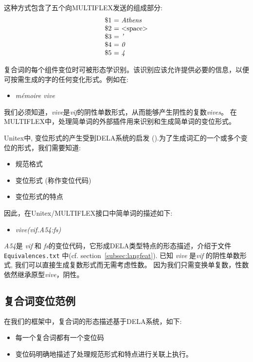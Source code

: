 \bigskip
\noindent 这种方式包含了五个向MULTIFLEX发送的组成部分:
\[
\begin{array}[c]{l}
$\$1 = \emph{Athens}$ \\
$\$2 = $<$space$>$$ \\
$\$3 = \emph{'}$ \\
$\$4 = \emph{0}$ \\
$\$5 = \emph{4}$ \\
\end{array}
\]

\bigskip
\noindent 复合词的每个组件变位时可被形态学识别。该识别应该允许提供必要的信息，以便可按需生成的字的任何变化形式。例如在:
\begin{itemize}
\item \emph{mémoire vive}
\end{itemize} 
我们必须知道，\emph{vive}是\emph{vif}的阴性单数形式，从而能够产生阴性的复数\emph{vives}。
在MULTIFLEX中，处理简单词的外部插件用来识别和生成简单词的变位形式。

\bigskip
\noindent Unitex中, 变位形式的产生受到DELA系统的启发
(\cite{dicos-francais}).为了生成词汇的一个或多个变位的形式，我们需要知道:

\begin{itemize}
\item 规范格式
\item 变位形式 (称作变位代码)
\item 变位形式的特点
\end{itemize}

\bigskip
\noindent 因此，在Unitex/MULTIFLEX接口中简单词的描述如下:

\begin{itemize}
\item \emph{vive(vif.A54:fs)}
\end{itemize} 

\bigskip
\noindent \emph{A54}是 \emph{vif} 和 \emph{fs}的变位代码，它形成DELA类型特点的形态描述，介绍于文件 \verb+Equivalences.txt+ 中(cf. section~\ref{subsec:langfeat}). 
已知 \emph{vive} 是\emph{vif} 的阴性单数形式, 我们可以直接生成复数形式而无需考虑性数。
因为我们只需变换单复数，性数依然继承原型\emph{vive}，阴性。

\subsection{复合词变位范例}
\label{subsec:paradigm}
在我们的框架中，复合词的形态描述基于DELA系统，如下:

\begin{itemize}
\item 每一个复合词都有一个变位码
\item 变位码明确地描述了处理规范形式和特点进行关联上执行。
\end{itemize}

